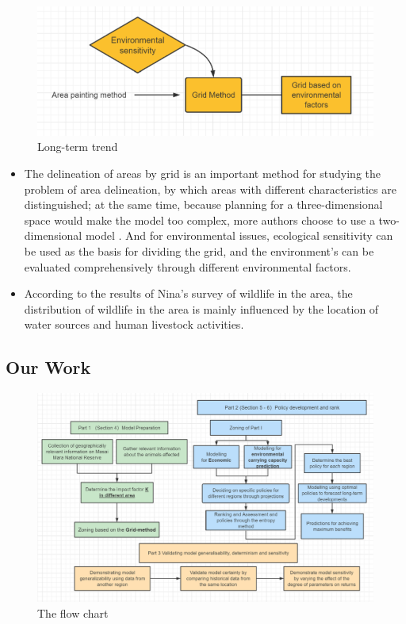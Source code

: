 \documentclass{mcmthesis}
\numberwithin{figure}{section}
\numberwithin{table}{section}
\numberwithin{equation}{section}
\begin{document}
\begin{figure}[htbp]
	\centering
	\includegraphics[width=0.5\linewidth]{./figures/review.png}
	\caption{Long-term trend}
	\label{F 1.3}
\end{figure}



\begin{itemize}
	\item The delineation of areas by grid is an important method for studying the problem of area delineation, by which areas with different characteristics are distinguished; at the same time, because planning for a three-dimensional space would make the model too complex, more authors choose to use a two-dimensional model \cite{1}. And for environmental issues, ecological sensitivity can be used as the basis for dividing the grid, and the environment's can be evaluated comprehensively through different environmental factors.\cite{2}
	\item According to the results of Nina's survey of wildlife in the area, the distribution of wildlife in the area is mainly influenced by the location of water sources and human livestock activities.\cite{1}

\end{itemize}

\subsection{Our Work}


\begin{figure}[htbp]
	\centering
	\includegraphics[width=0.85\linewidth]{./figures/our.png}
	\caption{The flow chart}
	\label{F 1.4}
\end{figure}
\end{document}
